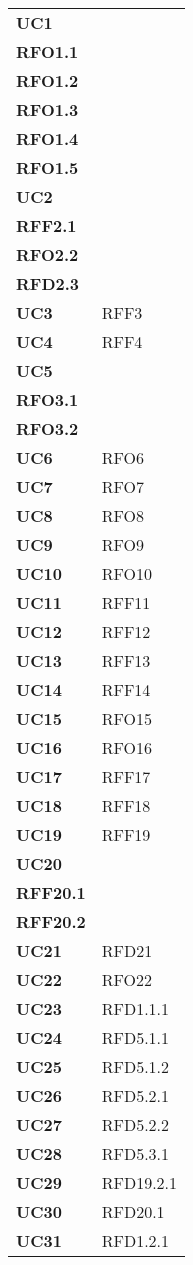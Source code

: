 \begin{longtable}[H]{>{\centering\bfseries}m{8cm}  >{\centering\arraybackslash}m{8cm}}
  \textbf{UC1} & {\begin{tabular}[c]{@{}c@{}}RFO1 \\ RFO1.1 \\ RFO1.2 \\ RFO1.3 \\ RFO1.4 \\ RFO1.5\end{tabular}}\\
  \textbf{UC2} & {\begin{tabular}[c]{@{}c@{}}RFF2 \\ RFF2.1 \\ RFO2.2 \\ RFD2.3\end{tabular}}\\
  \textbf{UC3} & RFF3 \\
  \textbf{UC4} & RFF4 \\
  \textbf{UC5} & {\begin{tabular}[c]{@{}c@{}}RFO3 \\ RFO3.1 \\ RFO3.2\end{tabular}}\\
  \textbf{UC6} & RFO6 \\ 
  \textbf{UC7} & RFO7 \\
  \textbf{UC8} & RFO8 \\
  \textbf{UC9} & RFO9 \\
  \textbf{UC10} & RFO10 \\
  \textbf{UC11} & RFF11 \\
  \textbf{UC12} & RFF12 \\
  \textbf{UC13} & RFF13 \\
  \textbf{UC14} & RFF14 \\
  \textbf{UC15} & RFO15 \\
  \textbf{UC16} & RFO16 \\
  \textbf{UC17} & RFF17 \\
  \textbf{UC18} & RFF18 \\
  \textbf{UC19} & RFF19 \\
  \textbf{UC20} & {\begin{tabular}[c]{@{}c@{}}RFF20 \\ RFF20.1 \\ RFF20.2 \end{tabular}} \\
  \textbf{UC21} & RFD21 \\
  \textbf{UC22} & RFO22\\
  \textbf{UC23} & RFD1.1.1 \\
  \textbf{UC24} & RFD5.1.1 \\
  \textbf{UC25} & RFD5.1.2 \\
  \textbf{UC26} & RFD5.2.1 \\
  \textbf{UC27} & RFD5.2.2 \\
  \textbf{UC28} & RFD5.3.1 \\
  \textbf{UC29} & RFD19.2.1\\
  \textbf{UC30} & RFD20.1 \\
  \textbf{UC31} & RFD1.2.1 \\

\end{longtable}
